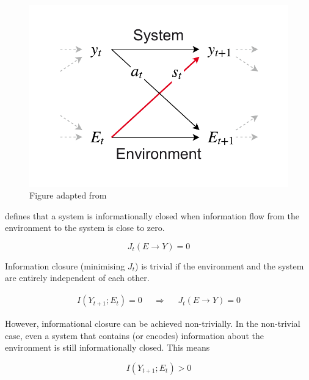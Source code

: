 \documentclass[utf8]{article}
\begin{document}
				\begin{figure}
					\includegraphics[width=\textwidth]{WritingMaterials/Fig_SystemAndEnv/SystemAndEnv.pdf}
					\caption{Figure adapted from \cite{BERTSCHINGER.2006}}
					\label{fig:SystemAndEnv}
				\end{figure}


			\noindent
			\cite{BERTSCHINGER.2006} defines that a system is informationally closed when information flow from the environment to the system is close to zero.

				\begin{equation}
				J_{t}(E \rightarrow Y )=0
				\end{equation}


			\noindent
			Information closure (minimising $J_t$) is trivial if the environment and the system are entirely independent of each other.

				\begin{equation}
				\begin{aligned}
				{I(Y_{t+1};E_{t})=0}&&{\Rightarrow}&&{J_{t}(E \rightarrow Y )=0}
				\end{aligned}
				\end{equation}


			\noindent
			However, informational closure can be achieved non-trivially. In the non-trivial case, even a system that contains (or encodes) information about the environment is still informationally closed. This means

				\begin{equation}
				I(Y_{t+1};E_{t}) > 0
				\end{equation}
\end{document}
